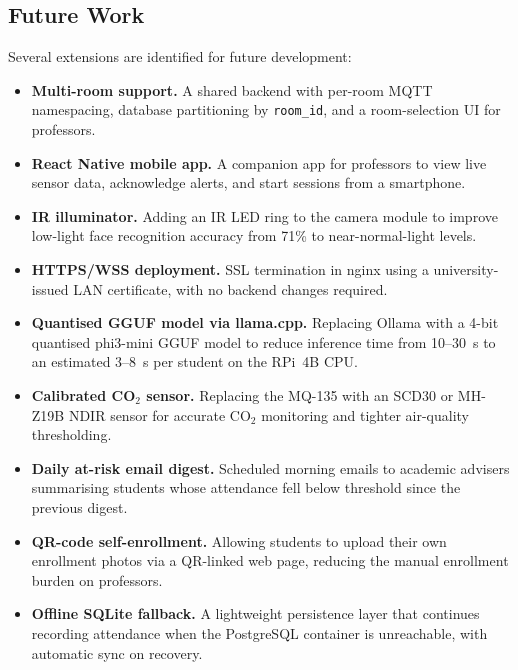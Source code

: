 \subsection{Future Work}
\label{subsec:future}

Several extensions are identified for future development:

\begin{itemize}
  \item \textbf{Multi-room support.}  A shared backend with
    per-room MQTT namespacing, database partitioning by
    \texttt{room\_id}, and a room-selection UI for professors.

  \item \textbf{React Native mobile app.}  A companion app for
    professors to view live sensor data, acknowledge alerts, and start
    sessions from a smartphone.

  \item \textbf{IR illuminator.}  Adding an IR LED ring to the camera
    module to improve low-light face recognition accuracy from 71\% to
    near-normal-light levels.

  \item \textbf{HTTPS/WSS deployment.}  SSL termination in nginx using
    a university-issued LAN certificate, with no backend changes
    required.

  \item \textbf{Quantised GGUF model via llama.cpp.}  Replacing Ollama
    with a 4-bit quantised phi3-mini GGUF model to reduce inference time
    from 10--30~s to an estimated 3--8~s per student on the RPi~4B CPU.

  \item \textbf{Calibrated CO$_2$ sensor.}  Replacing the MQ-135 with
    an SCD30 or MH-Z19B NDIR sensor for accurate CO$_2$ monitoring and
    tighter air-quality thresholding.

  \item \textbf{Daily at-risk email digest.}  Scheduled morning emails
    to academic advisers summarising students whose attendance fell below
    threshold since the previous digest.

  \item \textbf{QR-code self-enrollment.}  Allowing students to
    upload their own enrollment photos via a QR-linked web page,
    reducing the manual enrollment burden on professors.

  \item \textbf{Offline SQLite fallback.}  A lightweight persistence
    layer that continues recording attendance when the PostgreSQL
    container is unreachable, with automatic sync on recovery.
\end{itemize}
